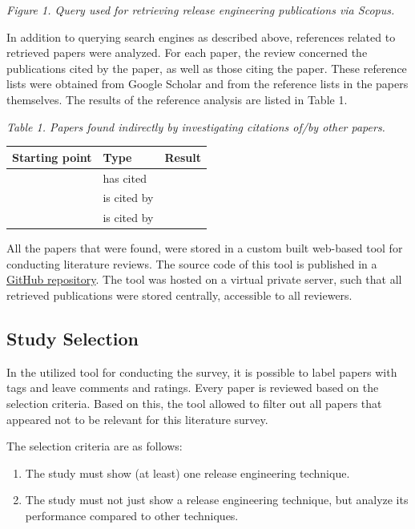 \documentclass[]{book}
\providecommand{\tightlist}{%
  \setlength{\itemsep}{0pt}\setlength{\parskip}{0pt}}
\begin{document}
\emph{Figure 1. Query used for retrieving release engineering
publications via Scopus.}

In addition to querying search engines as described above, references
related to retrieved papers were analyzed. For each paper, the review
concerned the publications cited by the paper, as well as those citing
the paper. These reference lists were obtained from Google Scholar and
from the reference lists in the papers themselves. The results of the
reference analysis are listed in Table 1.

\emph{Table 1. Papers found indirectly by investigating citations of/by
other papers.}

\begin{longtable}[]{@{}lll@{}}
\toprule
Starting point & Type & Result\tabularnewline
\midrule
\endhead
\citet{souza2015a} & has cited & \citet{plewnia2014a}
\citet{mantyla2015a}\tabularnewline
\citet{khomh2015a} & is cited by & \citet{poo-caama2016a}
\citet{teixeira2017a}\tabularnewline
\citet{mantyla2015a} & is cited by & \citet{rodriguez2017a}
\citet{cesar2017a}\tabularnewline
\bottomrule
\end{longtable}

All the papers that were found, were stored in a custom built web-based
tool for conducting literature reviews. The source code of this tool is
published in a \href{https://github.com/jessetilro/research}{GitHub
repository}. The tool was hosted on a virtual private server, such that
all retrieved publications were stored centrally, accessible to all
reviewers.

\subsection{Study Selection}\label{study-selection}

In the utilized tool for conducting the survey, it is possible to label
papers with tags and leave comments and ratings. Every paper is reviewed
based on the selection criteria. Based on this, the tool allowed to
filter out all papers that appeared not to be relevant for this
literature survey.

The selection criteria are as follows:

\begin{enumerate}
\def\labelenumi{\arabic{enumi}.}
\tightlist
\item
  The study must show (at least) one release engineering technique.
\item
  The study must not just show a release engineering technique, but
  analyze its performance compared to other techniques.
\end{enumerate}
\end{document}
